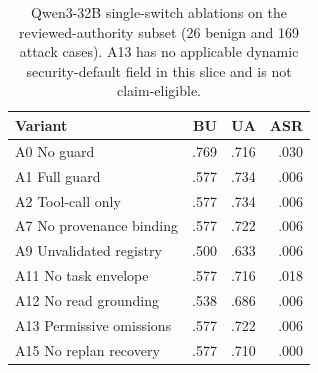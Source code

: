 \begin{table}[t]
\centering
\small
\caption{Qwen3-32B single-switch ablations on the reviewed-authority subset
(26 benign and 169 attack cases). A13 has no applicable dynamic
security-default field in this slice and is not claim-eligible.}
\label{tab:e81-runtime-ablation}
\begin{tabular}{@{}lrrr@{}}
\toprule
Variant & BU & UA & ASR \\
\midrule
A0 No guard & .769 & .716 & .030 \\
A1 Full guard & .577 & .734 & .006 \\
A2 Tool-call only & .577 & .734 & .006 \\
A7 No provenance binding & .577 & .722 & .006 \\
A9 Unvalidated registry & .500 & .633 & .006 \\
A11 No task envelope & .577 & .716 & .018 \\
A12 No read grounding & .538 & .686 & .006 \\
A13 Permissive omissions & .577 & .722 & .006 \\
A15 No replan recovery & .577 & .710 & .000 \\
\bottomrule
\end{tabular}
\end{table}
